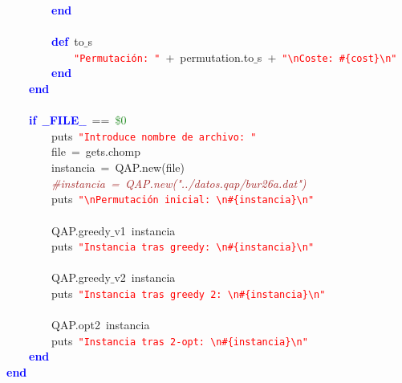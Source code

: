\mbox{}\ \ \ \ \ \ \ \ \textbf{\textcolor{Blue}{end}} \\
\mbox{}\ \ \ \ \ \ \ \  \\
\mbox{}\ \ \ \ \ \ \ \ \textbf{\textcolor{Blue}{def}}\ to$\_$s \\
\mbox{}\ \ \ \ \ \ \ \ \ \ \ \ \texttt{\textcolor{Red}{"{}Permutación:\ "{}}}\ \textcolor{BrickRed}{+}\ permutation\textcolor{BrickRed}{.}to$\_$s\ \textcolor{BrickRed}{+}\ \texttt{\textcolor{Red}{"{}\textbackslash{}nCoste:\ \#\{cost\}\textbackslash{}n"{}}} \\
\mbox{}\ \ \ \ \ \ \ \ \textbf{\textcolor{Blue}{end}} \\
\mbox{}\ \ \ \ \textbf{\textcolor{Blue}{end}} \\
\mbox{} \\
\mbox{}\ \ \ \ \textbf{\textcolor{Blue}{if}}\ \textbf{\textcolor{Blue}{$\_$$\_$FILE$\_$$\_$}}\ \textcolor{BrickRed}{==}\ \textcolor{ForestGreen}{\$0} \\
\mbox{}\ \ \ \ \ \ \ \ puts\ \texttt{\textcolor{Red}{"{}Introduce\ nombre\ de\ archivo:\ "{}}} \\
\mbox{}\ \ \ \ \ \ \ \ file\ \textcolor{BrickRed}{=}\ gets\textcolor{BrickRed}{.}chomp \\
\mbox{}\ \ \ \ \ \ \ \ instancia\ \textcolor{BrickRed}{=}\ QAP\textcolor{BrickRed}{.}new\textcolor{BrickRed}{(}file\textcolor{BrickRed}{)} \\
\mbox{}\ \ \ \ \ \ \ \ \textit{\textcolor{Brown}{\#instancia\ =\ QAP.new("{}../datos.qap/bur26a.dat"{})}} \\
\mbox{}\ \ \ \ \ \ \ \ puts\ \texttt{\textcolor{Red}{"{}\textbackslash{}nPermutación\ inicial:\ \textbackslash{}n\#\{instancia\}\textbackslash{}n"{}}} \\
\mbox{}\ \ \ \ \ \ \ \  \\
\mbox{}\ \ \ \ \ \ \ \ QAP\textcolor{BrickRed}{.}greedy$\_$v1\ instancia \\
\mbox{}\ \ \ \ \ \ \ \ puts\ \texttt{\textcolor{Red}{"{}Instancia\ tras\ greedy:\ \textbackslash{}n\#\{instancia\}\textbackslash{}n"{}}} \\
\mbox{}\ \ \ \ \ \ \ \  \\
\mbox{}\ \ \ \ \ \ \ \ QAP\textcolor{BrickRed}{.}greedy$\_$v2\ instancia \\
\mbox{}\ \ \ \ \ \ \ \ puts\ \texttt{\textcolor{Red}{"{}Instancia\ tras\ greedy\ 2:\ \textbackslash{}n\#\{instancia\}\textbackslash{}n"{}}} \\
\mbox{}\ \ \ \ \ \ \ \  \\
\mbox{}\ \ \ \ \ \ \ \ QAP\textcolor{BrickRed}{.}opt2\ instancia \\
\mbox{}\ \ \ \ \ \ \ \ puts\ \texttt{\textcolor{Red}{"{}Instancia\ tras\ 2-opt:\ \textbackslash{}n\#\{instancia\}\textbackslash{}n"{}}} \\
\mbox{}\ \ \ \ \textbf{\textcolor{Blue}{end}} \\
\mbox{}\textbf{\textcolor{Blue}{end}} \\
\mbox{}
